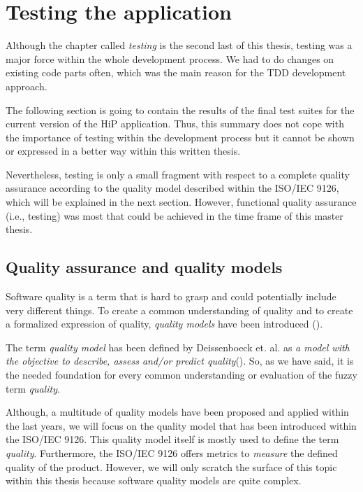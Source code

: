 \chapter[Testing the application]{Testing the application}
Although the chapter called \textit{testing} is the second last of this thesis, testing was a major force within the whole development process. We had to do changes on existing code parts often, which was the main reason for the \ac{TDD} development approach. 

The following section is going to contain the results of the final test suites for the current version of the HiP application. Thus, this summary does not cope with the importance of testing within the development process but it cannot be shown or expressed in a better way within this written thesis. 

Nevertheless, testing is only a small fragment with respect to a complete quality assurance according to the quality model described within the ISO/IEC 9126, which will be explained in the next section. However, functional quality assurance (i.e., testing) was most that could be achieved in the time frame of this master thesis. 

\section{Quality assurance and quality models}
Software quality is a term that is hard to grasp and could potentially include very different things. To create a common understanding of quality and to create a formalized expression of quality, \emph{quality models} have been introduced (\cite{waghmodesoftware}). 

The term \emph{quality model} has been defined by Deissenboeck et. al. as \glqq\emph{a model with the objective to describe, assess and/or predict quality}\grqq  (\cite{deissenboeck2009software}). So, as we have said, it is the needed foundation for every common understanding or evaluation of the fuzzy term \emph{quality}.

Although, a multitude of quality models have been proposed and applied within the last years, we will focus on the quality model that has been introduced within the ISO/IEC 9126. This quality model itself is mostly used to define the term \emph{quality}. Furthermore, the ISO/IEC 9126 offers metrics to \emph{measure} the defined quality of the product. However, we will only scratch the surface of this topic within this thesis because software quality models are quite complex.

